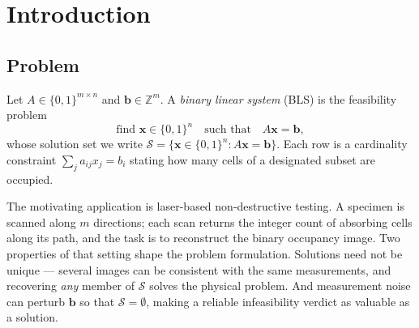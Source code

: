 \documentclass[11pt]{article}
\newcommand{\SOL}{\mathcal{S}}
\begin{document}
\begin{abstract}
We also report what the method does not achieve. CP-SAT solves the same instances $41$--$62\times$ faster at every size tested, and our system does not compete with it; decomposing that gap shows our branching produces $1.6\times$ \emph{fewer} nodes but processes them $78\times$ more slowly, locating the deficit in a research implementation rather than in search quality. And the cost advantage over probing, while asymptotically real, is only $1.3$--$1.7\times$ at the depths where prediction matters most on our instances, where probing additionally offers proofs rather than predictions. The contribution we claim is therefore methodological: exact conditional posteriors are an obtainable and well-posed supervision signal for branching, in-tree states are a better training distribution than root states, and the resulting heuristic transfers across instance size. Code, generators, exact-marginal labels and per-instance results are released.
\end{abstract}

\section{Introduction}
\label{sec:intro}

\subsection{Problem}

Let $A\in\{0,1\}^{m\times n}$ and $\mathbf{b}\in\mathbb{Z}^m$. A \emph{binary linear system} (BLS) is the feasibility problem
\begin{equation}
\text{find } \mathbf{x}\in\{0,1\}^n \quad\text{such that}\quad A\mathbf{x}=\mathbf{b},
\label{eq:bls}
\end{equation}
whose solution set we write $\SOL=\{\mathbf{x}\in\{0,1\}^n : A\mathbf{x}=\mathbf{b}\}$. Each row is a cardinality constraint $\sum_{j}a_{ij}x_j=b_i$ stating how many cells of a designated subset are occupied.

The motivating application is laser-based non-destructive testing. A specimen is scanned along $m$ directions; each scan returns the integer count of absorbing cells along its path, and the task is to reconstruct the binary occupancy image. Two properties of that setting shape the problem formulation. Solutions need not be unique --- several images can be consistent with the same measurements, and recovering \emph{any} member of $\SOL$ solves the physical problem. And measurement noise can perturb $\mathbf{b}$ so that $\SOL=\emptyset$, making a reliable infeasibility verdict as valuable as a solution.
\end{document}
